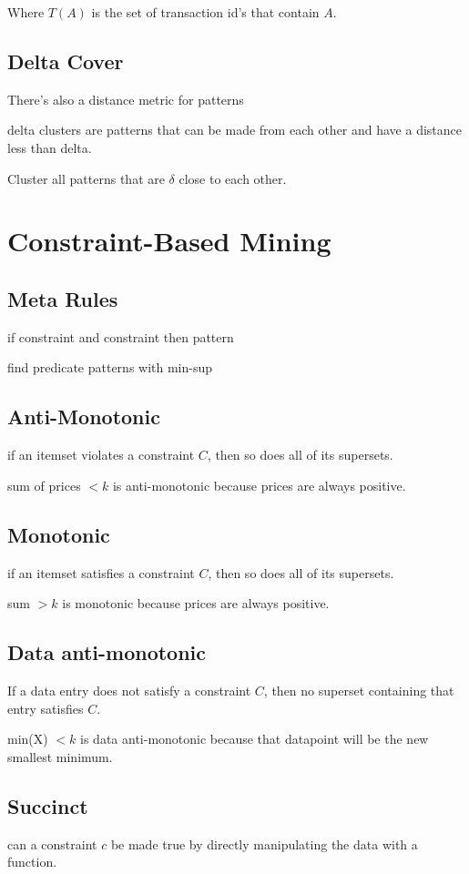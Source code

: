 \documentclass[fleqn]{report}
\begin{document}
Where $T(A)$ is the set of transaction id's that contain $A$.

\subsection{Delta Cover}
There's also a distance metric for patterns 

delta clusters are patterns that can be made from each other and have a 
distance less than delta. 

Cluster all patterns that are $\delta$ close to each other.

\section{Constraint-Based Mining}
\subsection{Meta Rules}
if constraint and constraint then pattern 

find predicate patterns with min-sup

\subsection{Anti-Monotonic}
if an itemset violates a constraint $C$, then so does 
all of its supersets.

sum of prices $< k$ is anti-monotonic because prices are always positive.

\subsection{Monotonic}
if an itemset satisfies a constraint $C$, then so does 
all of its supersets.

sum $> k$ is monotonic because prices are always positive.

\subsection{Data anti-monotonic}
If a data entry does not satisfy a constraint $C$, then no
superset containing that entry satisfies $C$.

min(X) $< k$ is data anti-monotonic because that datapoint 
will be the new smallest minimum.

\subsection{Succinct}
can a constraint $c$ be made true by directly manipulating 
the data with a function.
\end{document}
